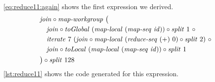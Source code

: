 \autoref{eq:reduce11:again} shows the first expression we derived.
\begin{align}
  \begin{aligned}
    &\join \circ \mapWorkgroup\ \big(\\
    &\quad \join \circ \toGlobal\ (\mapLocal\ (\mapSeq\ \id)) \circ \splitN\ 1\ \circ\\
    &\quad \iterateN\ 7\ (\join \circ \mapLocal\ (\reduceSeq\ (+)\ 0) \circ \splitN\ 2)\ \circ\\
    &\quad \join \circ \toLocal\ (\mapLocal\ (\mapSeq\ \id)) \circ \splitN\ 1\\
    &\big) \circ \splitN\ 128
  \end{aligned}
  \label{eq:reduce11:again}
\end{align}
\autoref{lst:reduce11} shows the \OpenCL code generated for this expression.
%
